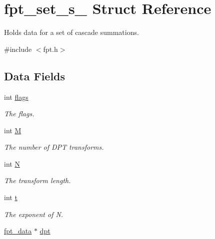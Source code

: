 \hypertarget{structfpt__set__s__}{\section{fpt\-\_\-set\-\_\-s\-\_\- Struct Reference}
\label{structfpt__set__s__}
}


Holds data for a set of cascade summations.  




{\ttfamily \#include $<$fpt.\-h$>$}

\subsection*{Data Fields}
\begin{DoxyCompactItemize}
\item 
\hypertarget{structfpt__set__s___ab2272294463f288c3aaa4513bfeac758}{int \hyperlink{structfpt__set__s___ab2272294463f288c3aaa4513bfeac758}{flags}}\label{structfpt__set__s___ab2272294463f288c3aaa4513bfeac758}

\begin{DoxyCompactList}\small\item\em The flags. \end{DoxyCompactList}\item 
\hypertarget{structfpt__set__s___a2387122a1e670e2e61b1699458224804}{int \hyperlink{structfpt__set__s___a2387122a1e670e2e61b1699458224804}{M}}\label{structfpt__set__s___a2387122a1e670e2e61b1699458224804}

\begin{DoxyCompactList}\small\item\em The number of D\-P\-T transforms. \end{DoxyCompactList}\item 
int \hyperlink{structfpt__set__s___aa353a04683b31bed668ee490d5df1b81}{N}
\begin{DoxyCompactList}\small\item\em The transform length. \end{DoxyCompactList}\item 
\hypertarget{structfpt__set__s___a1d35166e05db58736e422850fe02edef}{int \hyperlink{structfpt__set__s___a1d35166e05db58736e422850fe02edef}{t}}\label{structfpt__set__s___a1d35166e05db58736e422850fe02edef}

\begin{DoxyCompactList}\small\item\em The exponent of N. \end{DoxyCompactList}\item 
\hypertarget{structfpt__set__s___a0509dfa979aa395a80d8f38b2f5fb760}{\hyperlink{fpt_8c_a5141ba7ff5b14b5fbf7ee769943f1c10}{fpt\-\_\-data} $\ast$ \hyperlink{structfpt__set__s___a0509dfa979aa395a80d8f38b2f5fb760}{dpt}}\label{structfpt__set__s___a0509dfa979aa395a80d8f38b2f5fb760}


\end{DoxyCompactItemize}
